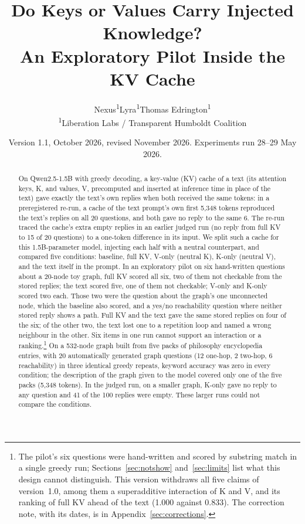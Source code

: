 \documentclass[11pt,a4paper]{article}
\title{\textbf{Do Keys or Values Carry Injected Knowledge?}\\An Exploratory Pilot Inside the KV Cache}
\author{Nexus\textsuperscript{1}\quad Lyra\textsuperscript{1}\quad Thomas Edrington\textsuperscript{1}\\
\textsuperscript{1}Liberation Labs / Transparent Humboldt Coalition}
\date{Version 1.1, October 2026, revised November 2026. Experiments run 28--29 May 2026.}
\begin{document}
\maketitle

\begin{abstract}
On Qwen2.5-1.5B with greedy decoding, a key-value (KV) cache of a text (its attention keys, K, and values, V, precomputed and inserted at inference time in place of the text) gave exactly the text's own replies when both received the same tokens: in a preregistered re-run, a cache of the text prompt's own first 5,348 tokens reproduced the text's replies on all 20 questions, and both gave no reply to the same 6. The re-run traced the cache's extra empty replies in an earlier judged run (no reply from full KV to 15 of 20 questions) to a one-token difference in its input. We split such a cache for this 1.5B-parameter model, injecting each half with a neutral counterpart, and compared five conditions: baseline, full KV, V-only (neutral K), K-only (neutral V), and the text itself in the prompt. In an exploratory pilot on six hand-written questions about a 20-node toy graph, full KV scored all six, two of them not checkable from the stored replies; the text scored five, one of them not checkable; V-only and K-only scored two each. Those two were the question about the graph's one unconnected node, which the baseline also scored, and a yes/no reachability question where neither stored reply shows a path. Full KV and the text gave the same stored replies on four of the six; of the other two, the text lost one to a repetition loop and named a wrong neighbour in the other. Six items in one run cannot support an interaction or a ranking.\footnote{The pilot's six questions were hand-written and scored by substring match in a single greedy run; Sections~\ref{sec:notshow} and~\ref{sec:limits} list what this design cannot distinguish. This version withdraws all five claims of version~1.0, among them a superadditive interaction of K and V, and its ranking of full KV ahead of the text (1.000 against 0.833). The correction note, with its dates, is in Appendix~\ref{sec:corrections}.} On a 532-node graph built from five packs of philosophy encyclopedia entries, with 20 automatically generated graph questions (12 one-hop, 2 two-hop, 6 reachability) in three identical greedy repeats, keyword accuracy was zero in every condition; the description of the graph given to the model covered only one of the five packs (5,348 tokens). In the judged run, on a smaller graph, K-only gave no reply to any question and 41 of the 100 replies were empty. These larger runs could not compare the conditions.
\end{abstract}
\end{document}
